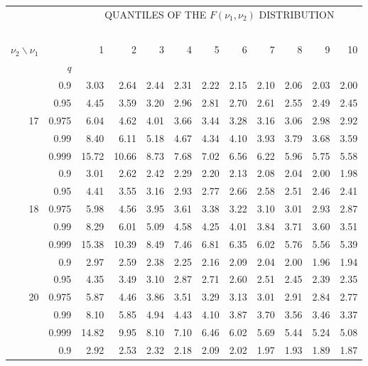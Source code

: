 \documentclass[12pt,a4paper,openany,twoside]{report}
\theoremstyle{definition}
\theoremstyle{remark}
\theoremstyle{plain}
\theoremstyle{definition}
\theoremstyle{definition}
\theoremstyle{definition}
\theoremstyle{remark}
\begin{document}
\newpage

\begin{center}
\begin{tabular}{rr@{\ \ }r@{\ \ }r@{\ \ }r@{\ \ }r@{\ \ }r@{\ \ }r@{\ \ }r@{\ \ }r@{\ \ }r@{\ \ }r@{ }}
& &\multicolumn{10}{c}{QUANTILES OF THE $F(\nu_1, \nu_2)$ DISTRIBUTION}\\
\ \\
$\nu_2\backslash\nu_1$ & & 1 & 2 & 3 & 4 & 5 & 6 & 7 & 8 & 9 & 10\\
 & \textit{q}  &  &  &  &  &  &  &  &  & & \\
\rule{0pt}{2.5ex} & 0.9 & 3.03 & 2.64 & 2.44 & 2.31 & 2.22 & 2.15 & 2.10 & 2.06 & 2.03 & 2.00\\
 & 0.95 & 4.45 & 3.59 & 3.20 & 2.96 & 2.81 & 2.70 & 2.61 & 2.55 & 2.49 & 2.45\\
17 & 0.975 & 6.04 & 4.62 & 4.01 & 3.66 & 3.44 & 3.28 & 3.16 & 3.06 & 2.98 & 2.92\\
 & 0.99 & 8.40 & 6.11 & 5.18 & 4.67 & 4.34 & 4.10 & 3.93 & 3.79 & 3.68 & 3.59\\
 & 0.999 & 15.72 & 10.66 & 8.73 & 7.68 & 7.02 & 6.56 & 6.22 & 5.96 & 5.75 & 5.58\\
\rule{0pt}{2.5ex} & 0.9 & 3.01 & 2.62 & 2.42 & 2.29 & 2.20 & 2.13 & 2.08 & 2.04 & 2.00 & 1.98\\
 & 0.95 & 4.41 & 3.55 & 3.16 & 2.93 & 2.77 & 2.66 & 2.58 & 2.51 & 2.46 & 2.41\\
18 & 0.975 & 5.98 & 4.56 & 3.95 & 3.61 & 3.38 & 3.22 & 3.10 & 3.01 & 2.93 & 2.87\\
 & 0.99 & 8.29 & 6.01 & 5.09 & 4.58 & 4.25 & 4.01 & 3.84 & 3.71 & 3.60 & 3.51\\
 & 0.999 & 15.38 & 10.39 & 8.49 & 7.46 & 6.81 & 6.35 & 6.02 & 5.76 & 5.56 & 5.39\\
\rule{0pt}{2.5ex} & 0.9 & 2.97 & 2.59 & 2.38 & 2.25 & 2.16 & 2.09 & 2.04 & 2.00 & 1.96 & 1.94\\
 & 0.95 & 4.35 & 3.49 & 3.10 & 2.87 & 2.71 & 2.60 & 2.51 & 2.45 & 2.39 & 2.35\\
20 & 0.975 & 5.87 & 4.46 & 3.86 & 3.51 & 3.29 & 3.13 & 3.01 & 2.91 & 2.84 & 2.77\\
 & 0.99 & 8.10 & 5.85 & 4.94 & 4.43 & 4.10 & 3.87 & 3.70 & 3.56 & 3.46 & 3.37\\
 & 0.999 & 14.82 & 9.95 & 8.10 & 7.10 & 6.46 & 6.02 & 5.69 & 5.44 & 5.24 & 5.08\\
\rule{0pt}{2.5ex} & 0.9 & 2.92 & 2.53 & 2.32 & 2.18 & 2.09 & 2.02 & 1.97 & 1.93 & 1.89 & 1.87\\

\end{tabular}
\end{center}
\end{document}
